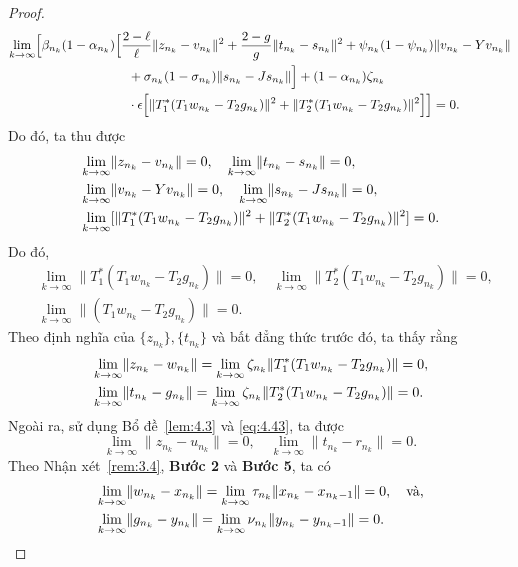 \documentclass{MyBook}
\theoremstyle{plain}
\theoremstyle{definition}
\theoremstyle{remark}
\numberwithin{equation}{chapter}
\newcommand{\nm}[1]{\lVert #1\rVert}
\begin{document}
\begin{proof}
\begin{align*}
\lim_{k\to\infty}\Bigl[\beta_{n_k}(1-\alpha_{n_k}) &\Bigl[\frac{2-\ell}{\ell}\nm{z_{n_k}-v_{n_k}}^2+\frac{2-g}{g}\nm{t_{n_k}-s_{n_k}}^2+\psi_{n_k}(1-\psi_{n_k})\nm{v_{n_k}-Yv_{n_k}}\\
&\quad +\sigma_{n_k}(1-\sigma_{n_k})\nm{s_{n_k}-Js_{n_k}}\Bigr]+(1-\alpha_{n_k})\zeta_{n_k}\\
&\quad \cdot\epsilon\Bigl[\nm{T_1^{*}(T_1w_{n_k}-T_2g_{n_k})}^2+\nm{T_2^{*}(T_1w_{n_k}-T_2g_{n_k})}^2\Bigr]\Bigr]=0.
\end{align*}
Do đó, ta thu được
\begin{align}
&\lim_{k\to\infty}\nm{z_{n_k}-v_{n_k}}=0,\quad \lim_{k\to\infty}\nm{t_{n_k}-s_{n_k}}=0,\notag\\
&\lim_{k\to\infty}\nm{v_{n_k}-Yv_{n_k}}=0,\quad \lim_{k\to\infty}\nm{s_{n_k}-Js_{n_k}}=0,\notag\\
&\lim_{k\to\infty}[\nm{T_1^{*}(T_1w_{n_k}-T_2g_{n_k})}^2+\nm{T_2^{*}(T_1w_{n_k}-T_2g_{n_k})}^2]=0. \label{eq:4.43}
\end{align}
Do đó,
\begin{align*}
&\lim_{k\to\infty}\nm{T_1^{*}(T_1w_{n_k}-T_2g_{n_k})}=0,\quad \lim_{k\to\infty}\nm{T_2^{*}(T_1w_{n_k}-T_2g_{n_k})}=0,\\
&\lim_{k\to\infty}\nm{(T_1w_{n_k}-T_2g_{n_k})}=0.
\end{align*}
Theo định nghĩa của $\{z_{n_k}\},\{t_{n_k}\}$ và bất đẳng thức trước đó, ta thấy rằng
\begin{align}
&\lim_{k\to\infty}\nm{z_{n_k}-w_{n_k}}=\lim_{k\to\infty}\zeta_{n_k}\nm{T_1^{*}(T_1w_{n_k}-T_2g_{n_k})}=0,\notag\\
&\lim_{k\to\infty}\nm{t_{n_k}-g_{n_k}}=\lim_{k\to\infty}\zeta_{n_k}\nm{T_2^{*}(T_1w_{n_k}-T_2g_{n_k})}=0. \label{eq:4.44}
\end{align}
Ngoài ra, sử dụng Bổ đề~\ref{lem:4.3} và \eqref{eq:4.43}, ta được
\begin{equation}
\lim_{k\to\infty}\nm{z_{n_k}-u_{n_k}}=0,\quad \lim_{k\to\infty}\nm{t_{n_k}-r_{n_k}}=0. \label{eq:4.45}
\end{equation}
Theo Nhận xét~\ref{rem:3.4}, \textbf{Bước 2} và \textbf{Bước 5}, ta có
\begin{align}
&\lim_{k\to\infty}\nm{w_{n_k}-x_{n_k}}=\lim_{k\to\infty}\tau_{n_k}\nm{x_{n_k}-x_{n_k-1}}=0,\quad\text{và,}\notag\\
&\lim_{k\to\infty}\nm{g_{n_k}-y_{n_k}}=\lim_{k\to\infty}\nu_{n_k}\nm{y_{n_k}-y_{n_k-1}}=0. \label{eq:4.46}
\end{align}

\end{proof}
\end{document}

